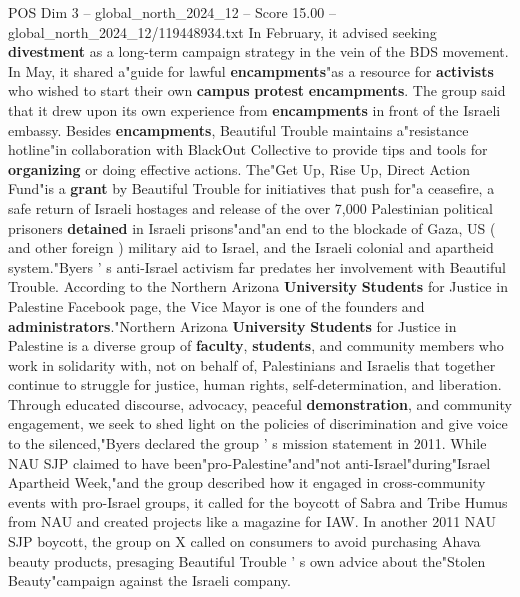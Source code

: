 \begin{textsample}{POS Dim 3 – global\_north\_2024\_12 – Score 15.00 – global\_north\_2024\_12/119448934.txt}
In February, it advised seeking \textbf{divestment} as a long-term campaign strategy in the vein of the BDS movement.
In May, it shared a"guide for lawful \textbf{encampments}"as a resource for \textbf{activists} who wished to start their own \textbf{campus} \textbf{protest} \textbf{encampments}.
The group said that it drew upon its own experience from \textbf{encampments} in front of the Israeli embassy.
Besides \textbf{encampments}, Beautiful Trouble maintains a"resistance hotline"in collaboration with BlackOut Collective to provide tips and tools for \textbf{organizing} or doing effective actions.
The"Get Up, Rise Up, Direct Action Fund"is a \textbf{grant} by Beautiful Trouble for initiatives that push for"a ceasefire, a safe return of Israeli hostages and release of the over 7,000 Palestinian political prisoners \textbf{detained} in Israeli prisons"and"an end to the blockade of Gaza, US ( and other foreign ) military aid to Israel, and the Israeli colonial and apartheid system."Byers ' s anti-Israel activism far predates her involvement with Beautiful Trouble.
According to the Northern Arizona \textbf{University} \textbf{Students} for Justice in Palestine Facebook page, the Vice Mayor is one of the founders and \textbf{administrators}."Northern Arizona \textbf{University} \textbf{Students} for Justice in Palestine is a diverse group of \textbf{faculty}, \textbf{students}, and community members who work in solidarity with, not on behalf of, Palestinians and Israelis that together continue to struggle for justice, human rights, self-determination, and liberation.
Through educated discourse, advocacy, peaceful \textbf{demonstration}, and community engagement, we seek to shed light on the policies of discrimination and give voice to the silenced,"Byers declared the group ' s mission statement in 2011.
While NAU SJP claimed to have been"pro-Palestine"and"not anti-Israel"during"Israel Apartheid Week,"and the group described how it engaged in cross-community events with pro-Israel groups, it called for the boycott of Sabra and Tribe Humus from NAU and created projects like a magazine for IAW.
In another 2011 NAU SJP boycott, the group on X called on consumers to avoid purchasing Ahava beauty products, presaging Beautiful Trouble ' s own advice about the"Stolen Beauty"campaign against the Israeli company.

\end{textsample}
